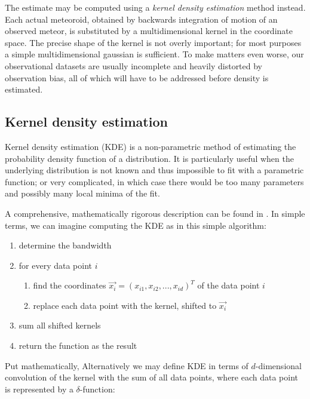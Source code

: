     The estimate may be computed using a \emph{kernel density estimation} method instead.
    Each actual meteoroid, obtained by backwards integration of motion of an observed meteor,
    is substituted by a multidimensional kernel in the coordinate space. The precise shape of the kernel
    is not overly important; for most purposes a simple multidimensional gaussian is sufficient.
    To make matters even worse, our observational datasets are usually incomplete
    and heavily distorted by observation bias, all of which will have to be addressed before density is estimated.

    \subsection{Kernel density estimation} \label{mmk}
        Kernel density estimation (KDE) is a non-parametric method of estimating the probability density function
        of a distribution. It is particularly useful when the underlying distribution is not known and thus impossible
        to fit with a parametric function; or very complicated, in which case there would be too many parameters
        and possibly many local minima of the fit.

        A comprehensive, mathematically rigorous description can be found in \citep{hwang+1994}.
        In simple terms, we can imagine computing the KDE as in this simple algorithm:
        \begin{enumerate}
            \item determine the bandwidth
            \item for every data point $i$
                \begin{enumerate}[label=\arabic*.]
                \item find the coordinates $\vec{x_i} = (x_{i1}, x_{i2}, ..., x_{id})^T$ of the data point $i$
                \item replace each data point with the kernel, shifted to $\vec{x_i}$
            \end{enumerate}
            \item sum all shifted kernels
            \item return the function as the result
        \end{enumerate}

        Put mathematically,
        Alternatively we may define KDE in terms of $d$-dimensional convolution of the kernel with the sum of all data points,
        where each data point is represented by a $\delta$-function:

